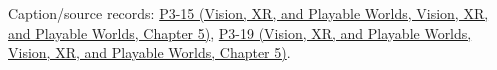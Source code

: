 Caption/source records: \href{../07-Vision-XR-and-Playable-Worlds/main.pdf\#nameddest=04-visual-computing-ii-ch036-p3-15---ray-tracing}{P3-15 (Vision, XR, and Playable Worlds, Vision, XR, and Playable Worlds, Chapter 5)}, \href{../07-Vision-XR-and-Playable-Worlds/main.pdf\#nameddest=04-visual-computing-ii-ch036-p3-19---shadows-part-2}{P3-19 (Vision, XR, and Playable Worlds, Vision, XR, and Playable Worlds, Chapter 5)}.
